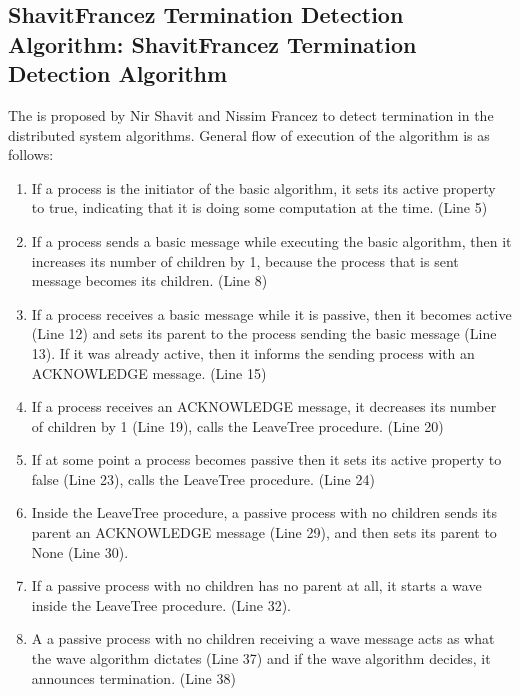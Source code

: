 \documentclass[letterpaper,10pt,english]{sphinxmanual}
\begin{document}
\subsection{Shavit\sphinxhyphen{}Francez Termination Detection Algorithm: Shavit\sphinxhyphen{}Francez Termination Detection Algorithm}
\label{\detokenize{docs/ShavitFrancez/algorithm:shavit-francez-termination-detection-algorithm-shavitfrancezalg}}
\sphinxAtStartPar
The {\hyperref[\detokenize{docs/ShavitFrancez/algorithm:shavitfrancezterminationdetectionalgorithm}]{}} is proposed by Nir Shavit and Nissim Francez to detect termination in the distributed system algorithms. General flow of execution of the algorithm is as follows:
\begin{enumerate}
%
\item {} 
\sphinxAtStartPar
If a process is the initiator of the basic algorithm, it sets its active property to true, indicating that it is doing some computation at the time. (Line 5)

\item {} 
\sphinxAtStartPar
If a process sends a basic message while executing the basic algorithm, then it increases its number of children by 1, because the process that is sent message becomes its children. (Line 8)

\item {} 
\sphinxAtStartPar
If a process receives a basic message while it is passive, then it becomes active (Line 12) and sets its parent to the process sending the basic message (Line 13). If it was already active, then it informs the sending process with an ACKNOWLEDGE message. (Line 15)

\item {} 
\sphinxAtStartPar
If a process receives an ACKNOWLEDGE message, it decreases its number of children by 1 (Line 19), calls the LeaveTree procedure. (Line 20)

\item {} 
\sphinxAtStartPar
If at some point a process becomes passive then it sets its active property to false (Line 23), calls the LeaveTree procedure. (Line 24)

\item {} 
\sphinxAtStartPar
Inside the LeaveTree procedure, a passive process with no children sends its parent an ACKNOWLEDGE message (Line 29), and then sets its parent to None (Line 30).

\item {} 
\sphinxAtStartPar
If a passive process with no children has no parent at all, it starts a wave inside the LeaveTree procedure. (Line 32).

\item {} 
\sphinxAtStartPar
A a passive process with no children receiving a wave message acts as what the wave algorithm dictates (Line 37) and if the wave algorithm decides, it announces termination. (Line 38)

\end{enumerate}
\end{document}
